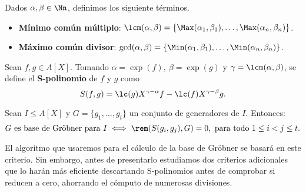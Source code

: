 \begin{definicion}
    Dados $\alpha,\beta \in \Nn$, definimos los siguiente términos.
    \begin{itemize}
        \item \textbf{Mínimo común múltiplo}: $\lcm(\alpha,\beta) = \{\Max(\alpha_1, \beta_1),\dots, \Max(\alpha_n, \beta_n)\}$.
        \item \textbf{Máximo común divisor}: $\gcd(\alpha,\beta) = \{\Min(\alpha_1, \beta_1),\dots, \Min(\alpha_n, \beta_n)\}$.
    \end{itemize}
\end{definicion}

\begin{definicion}
    Sean $f,g \in A[X]$. Tomando $\alpha=\exp(f),\ \beta=\exp(g)$ y $\gamma = \lcm(\alpha,\beta)$, se define el \textbf{S-polinomio} de $f$ y $g$ como
    \begin{equation*}
        S(f,g) = \lc(g)X^{\gamma-\alpha}f - \lc(f)X^{\gamma-\beta}g.
    \end{equation*}
\end{definicion}

\begin{teorema}\label{t:criterio}
    Sean $I\le A[X]$ y $G=\{g_1,\dots, g_t\}$ un conjunto de generadores de $I$. Entonces:
    \begin{equation*}
        G \text{ es base de Gröbner para } I \iff \rem(S(g_i,g_j), G)=0,\ \text{para todo } 1\le i<j\le t.
    \end{equation*}
\end{teorema}

El algoritmo que usaremos para el cálculo de la base de Gröbner se basará en este criterio. Sin embargo, antes de presentarlo estudiamos dos criterios adicionales \cite{criterio1,criterio2} que lo harán más eficiente descartando S-polinomios antes de comprobar si reducen a cero, ahorrando el cómputo de numerosas divisiones.

